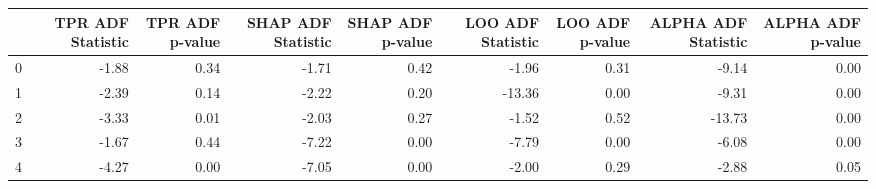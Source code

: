 \begin{tabular}{lrrrrrrrr}
\toprule
 & TPR ADF Statistic & TPR ADF p-value & SHAP ADF Statistic & SHAP ADF p-value & LOO ADF Statistic & LOO ADF p-value & ALPHA ADF Statistic & ALPHA ADF p-value \\
\midrule
0 & -1.88 & 0.34 & -1.71 & 0.42 & -1.96 & 0.31 & -9.14 & 0.00 \\
1 & -2.39 & 0.14 & -2.22 & 0.20 & -13.36 & 0.00 & -9.31 & 0.00 \\
2 & -3.33 & 0.01 & -2.03 & 0.27 & -1.52 & 0.52 & -13.73 & 0.00 \\
3 & -1.67 & 0.44 & -7.22 & 0.00 & -7.79 & 0.00 & -6.08 & 0.00 \\
4 & -4.27 & 0.00 & -7.05 & 0.00 & -2.00 & 0.29 & -2.88 & 0.05 \\
\bottomrule
\end{tabular}

